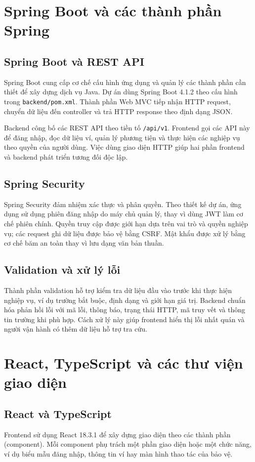 \section{Spring Boot và các thành phần Spring}

\subsection{Spring Boot và REST API}
Spring Boot cung cấp cơ chế cấu hình ứng dụng và quản lý các thành phần cần thiết để xây dựng dịch vụ Java. Dự án dùng Spring Boot 4.1.2 theo cấu hình trong \texttt{backend/pom.xml}. Thành phần Web MVC tiếp nhận HTTP request, chuyển dữ liệu đến controller và trả HTTP response theo định dạng JSON.

Backend công bố các REST API theo tiền tố \texttt{/api/v1}. Frontend gọi các API này để đăng nhập, đọc dữ liệu ví, quản lý phương tiện và thực hiện các nghiệp vụ theo quyền của người dùng. Việc dùng giao diện HTTP giúp hai phần frontend và backend phát triển tương đối độc lập.

\subsection{Spring Security}
Spring Security đảm nhiệm xác thực và phân quyền. Theo thiết kế dự án, ứng dụng sử dụng phiên đăng nhập do máy chủ quản lý, thay vì dùng JWT làm cơ chế phiên chính. Quyền truy cập được giới hạn dựa trên vai trò và quyền nghiệp vụ; các request ghi dữ liệu được bảo vệ bằng CSRF. Mật khẩu được xử lý bằng cơ chế băm an toàn thay vì lưu dạng văn bản thuần.

\subsection{Validation và xử lý lỗi}
Thành phần validation hỗ trợ kiểm tra dữ liệu đầu vào trước khi thực hiện nghiệp vụ, ví dụ trường bắt buộc, định dạng và giới hạn giá trị. Backend chuẩn hóa phản hồi lỗi với mã lỗi, thông báo, trạng thái HTTP, mã truy vết và thông tin trường khi phù hợp. Cách xử lý này giúp frontend hiển thị lỗi nhất quán và người vận hành có thêm dữ liệu hỗ trợ tra cứu.

\section{React, TypeScript và các thư viện giao diện}

\subsection{React và TypeScript}
Frontend sử dụng React 18.3.1 để xây dựng giao diện theo các thành phần (component). Mỗi component phụ trách một phần giao diện hoặc một chức năng, ví dụ biểu mẫu đăng nhập, thông tin ví hay màn hình thao tác của bảo vệ.


